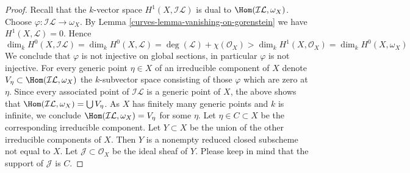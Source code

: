 \begin{proof}
\medskip\noindent
Recall that the $k$-vector space $H^1(X, \mathcal{I}\mathcal{L})$
is dual to $\Hom(\mathcal{I}\mathcal{L}, \omega_X)$.
Choose $\varphi : \mathcal{I}\mathcal{L} \to \omega_X$.
By Lemma \ref{curves-lemma-vanishing-on-gorenstein} we have
$H^1(X, \mathcal{L}) = 0$. Hence
$$
\dim_k H^0(X, \mathcal{I}\mathcal{L}) = \dim_k H^0(X, \mathcal{L}) =
\deg(\mathcal{L}) + \chi(\mathcal{O}_X) > \dim_k H^1(X, \mathcal{O}_X) =
\dim_k H^0(X, \omega_X)
$$
We conclude that $\varphi$ is not injective on global sections, in particular
$\varphi$ is not injective. For every generic point $\eta \in X$
of an irreducible component of $X$ denote
$V_\eta \subset \Hom(\mathcal{I}\mathcal{L}, \omega_X)$ the $k$-subvector
space consisting of those $\varphi$ which are zero at $\eta$.
Since every associated point of $\mathcal{I}\mathcal{L}$
is a generic point of $X$, the above shows that
$\Hom(\mathcal{I}\mathcal{L}, \omega_X) = \bigcup V_\eta$.
As $X$ has finitely many generic points and $k$ is infinite, we conclude
$\Hom(\mathcal{I}\mathcal{L}, \omega_X) = V_\eta$ for some $\eta$.
Let $\eta \in C \subset X$ be the corresponding irreducible component.
Let $Y \subset X$ be the union of the other irreducible components
of $X$. Then $Y$ is a nonempty reduced closed subscheme not equal to $X$.
Let $\mathcal{J} \subset \mathcal{O}_X$ be the ideal sheaf of $Y$.
Please keep in mind that the support of $\mathcal{J}$ is $C$.


\end{proof}
